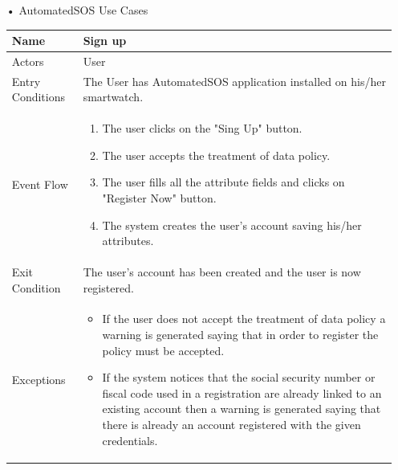 \begin{enumerate}
\item[•]{\Large AutomatedSOS Use Cases}
\FloatBarrier
\begin{table}[h]
\begin{tabular}{|l|l|}
\hline
Name             & Sign up \\ \hline
Actors           & User  \\ \hline
Entry Conditions & The User has AutomatedSOS application installed on his/her smartwatch.    \\ \hline
Event Flow       & \parbox{.45\textwidth}{\begin{enumerate}
            \item The user clicks on the "Sing Up" button.
            \item The user accepts the treatment of data policy.
            \item The user fills all the attribute fields and clicks on "Register Now" button.
            \item The system creates the user's account saving his/her attributes.
        \end{enumerate}}\\ \hline
Exit Condition   & The user's account has been created and the user is now registered.\\ \hline
Exceptions       & \parbox{.45\textwidth}  
{\begin{itemize}
\item If the user does not accept the treatment of data policy a warning is generated saying that in order to register the policy must be accepted.
\item If the system notices that the social security number or fiscal code used in a registration are already linked to an existing account then a warning is generated saying that there is already an account registered with the given credentials.
\end{itemize}}\\ \hline
\end{tabular}
\end{table}
\FloatBarrier


\end{enumerate}
